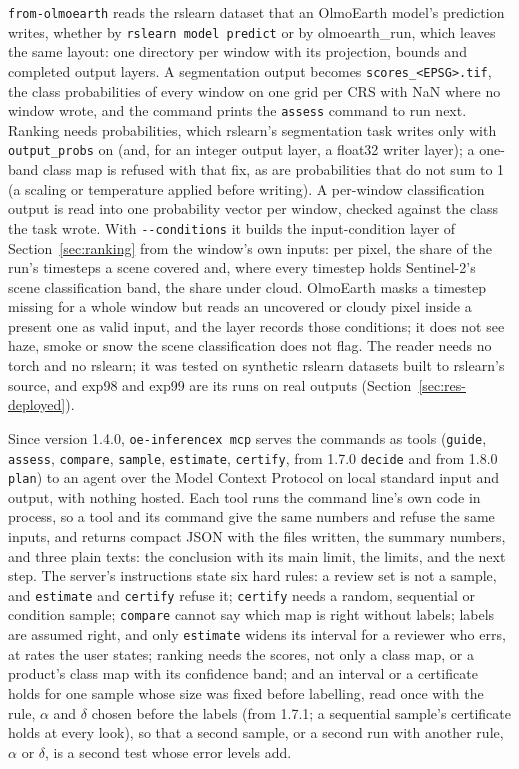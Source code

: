\documentclass[11pt,a4paper]{article}
\newcommand{\code}[1]{\texttt{#1}}
\begin{document}
\code{from-olmoearth} reads the rslearn dataset that an OlmoEarth model's prediction writes, whether by
\code{rslearn model predict} or by olmoearth\_run, which leaves the same layout: one directory per window with its
projection, bounds and completed output layers. A segmentation output becomes \code{scores\_<EPSG>.tif}, the class
probabilities of every window on one grid per CRS with NaN where no window wrote, and the command prints the
\code{assess} command to run next. Ranking needs probabilities, which rslearn's segmentation task writes only with
\code{output\_probs} on (and, for an integer output layer, a float32 writer layer); a one-band class map is refused
with that fix, as are probabilities that do not sum to 1 (a scaling or temperature applied before writing). A
per-window classification output is read into one probability vector per window, checked against the class the task
wrote. With \code{-{}-conditions} it builds the input-condition layer of Section~\ref{sec:ranking} from the window's
own inputs: per pixel, the share of the run's timesteps a scene covered and, where every timestep holds Sentinel-2's
scene classification band, the share under cloud. OlmoEarth masks a timestep missing for a whole window but reads an
uncovered or cloudy pixel inside a present one as valid input, and the layer records those conditions; it does not see
haze, smoke or snow the scene classification does not flag. The reader needs no torch and no rslearn; it was tested on
synthetic rslearn datasets built to rslearn's source, and exp98 and exp99 are its runs on real outputs
(Section~\ref{sec:res-deployed}).

Since version 1.4.0, \code{oe-inferencex mcp} serves the commands as tools (\code{guide},
\code{assess}, \code{compare}, \code{sample}, \code{estimate}, \code{certify}, from 1.7.0 \code{decide} and from
1.8.0 \code{plan}) to an
agent over the Model Context Protocol on local standard input and output, with
nothing hosted. Each tool runs the command line's own code in process, so a tool and its command give the same numbers
and refuse the same inputs, and returns compact JSON with the files written, the summary numbers, and three plain
texts: the conclusion with its main limit, the limits, and the next step. The server's instructions state six hard
rules: a review set is not a sample, and \code{estimate} and \code{certify} refuse it; \code{certify} needs a random,
sequential or condition sample; \code{compare} cannot say which map is right without labels; labels are assumed right,
and only \code{estimate} widens its interval for a reviewer who errs, at rates the user states; ranking needs the
scores, not only a class map, or a product's class map with its confidence band; and an interval or a certificate holds
for one sample whose size was fixed before labelling, read once with the rule, $\alpha$ and $\delta$ chosen before the
labels (from 1.7.1; a sequential sample's certificate holds at every look), so that a second sample, or a second run
with another rule, $\alpha$ or $\delta$, is a second test whose error levels add.
\end{document}
